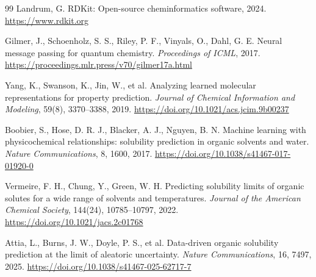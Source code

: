 \documentclass[11pt]{article}
\begin{document}
\begin{thebibliography}{99}
 Landrum, G. RDKit: Open-source cheminformatics software, 2024. \url{https://www.rdkit.org}

 Gilmer, J., Schoenholz, S. S., Riley, P. F., Vinyals, O., Dahl, G. E. Neural message passing for quantum chemistry. \textit{Proceedings of ICML}, 2017. \url{https://proceedings.mlr.press/v70/gilmer17a.html}

 Yang, K., Swanson, K., Jin, W., et al. Analyzing learned molecular representations for property prediction. \textit{Journal of Chemical Information and Modeling}, 59(8), 3370--3388, 2019. \url{https://doi.org/10.1021/acs.jcim.9b00237}

 Boobier, S., Hose, D. R. J., Blacker, A. J., Nguyen, B. N. Machine learning with physicochemical relationships: solubility prediction in organic solvents and water. \textit{Nature Communications}, 8, 1600, 2017. \url{https://doi.org/10.1038/s41467-017-01920-0}

 Vermeire, F. H., Chung, Y., Green, W. H. Predicting solubility limits of organic solutes for a wide range of solvents and temperatures. \textit{Journal of the American Chemical Society}, 144(24), 10785--10797, 2022. \url{https://doi.org/10.1021/jacs.2c01768}

 Attia, L., Burns, J. W., Doyle, P. S., et al. Data-driven organic solubility prediction at the limit of aleatoric uncertainty. \textit{Nature Communications}, 16, 7497, 2025. \url{https://doi.org/10.1038/s41467-025-62717-7}

\end{thebibliography}
\end{document}
